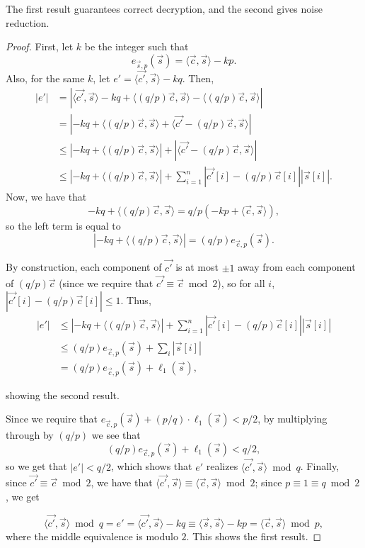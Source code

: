     The first result guarantees correct decryption, and the second gives noise reduction.

    \begin{proof}
        First, let $k$ be the integer such that
        \[e_{\vec{s}, p}(\vec{s}) = \langle \vec{c}, \vec{s} \rangle - kp.\]
        Also, for the same $k$, let $e' = \langle \vec{c'}, \vec{s} \rangle - kq$.
        Then,
        \begin{align*}
            |e'| &= \left| \langle \vec{c'}, \vec{s} \rangle - kq + \langle (q/p) \vec{c}, \vec{s} \rangle - \langle (q/p) \vec{c}, \vec{s} \rangle \right|\\
            &= \left| -kq + \langle (q/p) \vec{c}, \vec{s} \rangle + \langle \vec{c'} - (q/p) \vec{c}, \vec{s} \rangle \right| \\
            &\leq \left| -kq + \langle (q/p) \vec{c}, \vec{s} \rangle \right| + \left| \langle \vec{c'} - (q/p) \vec{c}, \vec{s} \rangle \right|\\
            &\leq \left| -kq + \langle (q/p) \vec{c}, \vec{s} \rangle \right| + \sum_{i = 1}^n |\vec{c'}[i] - (q/p)\vec{c}[i]| |\vec{s}[i]|.
        \end{align*}
        Now, we have that
        \[ -kq + \langle (q/p) \vec{c}, \vec{s} \rangle = q/p (-kp + \langle \vec{c}, \vec{s} \rangle),\]
        so the left term is equal to
        \[\left| -kq + \langle (q/p) \vec{c}, \vec{s} \rangle \right| = (q/p) e_{\vec{c}, p}(\vec{s}).\]

        By construction, each component of $\vec{c'}$ is at most $\pm 1$ away from each component of $(q/p) \vec{c}$ (since we require that $\vec{c'} \equiv \vec{c} \bmod 2$), so for all $i$, $\left| \vec{c'}[i] - (q/p) \vec{c}[i] \right| \leq 1$. Thus,
        \begin{align*}
            |e'| &\leq \left| -kq + \langle (q/p) \vec{c}, \vec{s} \rangle \right| + \sum_{i = 1}^n |\vec{c'}[i] - (q/p)\vec{c}[i]| |\vec{s}[i]| \\
            &\leq (q/p) e_{\vec{c}, p}(\vec{s}) + \sum_i |\vec{s}[i]| \\
            &= (q/p) e_{\vec{c}, p}(\vec{s}) + \ell_1(\vec{s}),
        \end{align*}

        showing the second result.

        Since we require that $e_{\vec{c}, p}(\vec{s}) + (p / q) \cdot \ell_1(\vec{s}) < p/2$, by multiplying through by $(q/p)$ we see that
        \[(q/p) e_{\vec{c}, p}(\vec{s}) + \ell_1(\vec{s}) < q/2, \]
        so we get that $|e'| < q/2$, which shows that $e'$ realizes $\langle \vec{c'}, \vec{s} \rangle \bmod q$. Finally, since $\vec{c'} \equiv \vec{c} \bmod 2$, we have that $\langle \vec{c'}, \vec{s} \rangle \equiv \langle \vec{c}, \vec{s} \rangle \bmod 2$;
        since $p \equiv 1 \equiv q \bmod 2$, we get

        \[\langle \vec{c'}, \vec{s} \rangle \bmod q = e' = \langle \vec{c'}, \vec{s} \rangle - kq \equiv \langle \vec{s}, \vec{s} \rangle - kp = \langle \vec{c}, \vec{s} \rangle \bmod p,\]
        where the middle equivalence is modulo $2$. This shows the first result.

    \end{proof}

